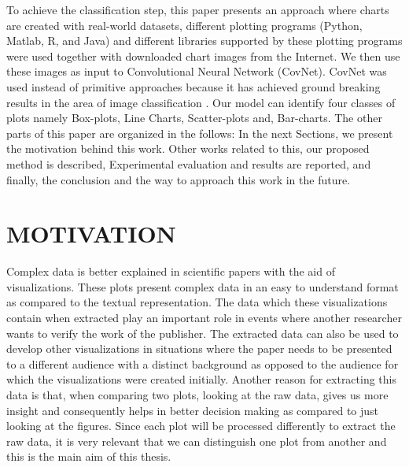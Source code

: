 \documentclass[12pt, a4paper,oneside]{report}
\begin{document}
To achieve the classification step, this paper presents an approach where charts are created with real-world datasets, different plotting programs (Python, Matlab, R, and Java) and different libraries supported by these plotting programs were used together with downloaded chart images from the Internet. We then use these images as input to Convolutional Neural Network (CovNet). CovNet was used instead of primitive approaches because it has achieved ground breaking results in the area of image classification \cite{amara2017convolutional}. Our model can identify four classes of plots namely Box-plots, Line Charts, Scatter-plots and, Bar-charts.
The other parts of this paper are organized in the follows: 
In the next Sections, we present the motivation behind this work. Other works related to this,  our proposed method is described,
Experimental evaluation and results are reported, and finally, the conclusion and the way to approach this work in the future.

\section{MOTIVATION}
Complex data is better explained in scientific papers with the aid of visualizations. These plots present complex data in an easy to understand format as compared to the textual representation. The data which these visualizations contain when extracted play an important role in events where another researcher wants to verify the work of the publisher. The extracted data can also be used to develop other visualizations in situations where the paper needs to be presented to a different audience with a distinct background as opposed to the audience for which the visualizations were created initially. Another reason for extracting this data is that, when comparing two plots, looking at the raw data, gives us more insight and consequently helps in better decision making as compared to just looking at the figures. Since each plot will be processed differently to extract the raw data, it is very relevant that we can distinguish one plot from another and this is the main aim of this thesis.
\end{document}
